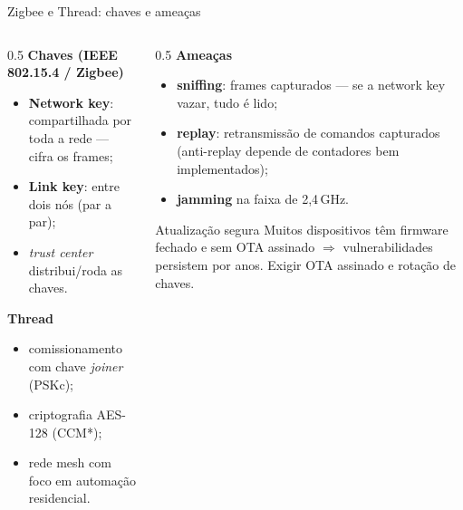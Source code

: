 \documentclass[aspectratio=169,11pt]{beamer}
\begin{document}
\begin{frame}{Zigbee e Thread: chaves e ameaças}
  \begin{columns}
    \begin{column}{0.5\textwidth}
      \textbf{Chaves (IEEE 802.15.4 / Zigbee)}
      \begin{itemize}
        \item \textbf{Network key}: compartilhada por toda a rede --- cifra os frames;
        \item \textbf{Link key}: entre dois nós (par a par);
        \item \emph{trust center} distribui/roda as chaves.
      \end{itemize}
      \textbf{Thread}
      \begin{itemize}
        \item comissionamento com chave \emph{joiner} (PSKc);
        \item criptografia AES-128 (CCM*);
        \item rede mesh com foco em automação residencial.
      \end{itemize}
    \end{column}
    \begin{column}{0.5\textwidth}
      \textbf{Ameaças}
      \begin{itemize}
        \item \textbf{sniffing}: frames capturados --- se a network key vazar, tudo é lido;
        \item \textbf{replay}: retransmissão de comandos capturados (anti-replay depende de contadores bem implementados);
        \item \textbf{jamming} na faixa de 2,4\,GHz.
      \end{itemize}
      \begin{alertblock}{Atualização segura}
        Muitos dispositivos têm firmware fechado e sem OTA assinado $\Rightarrow$ vulnerabilidades persistem por anos. Exigir OTA assinado e rotação de chaves.
      \end{alertblock}
    \end{column}
  \end{columns}
\end{frame}
\end{document}

